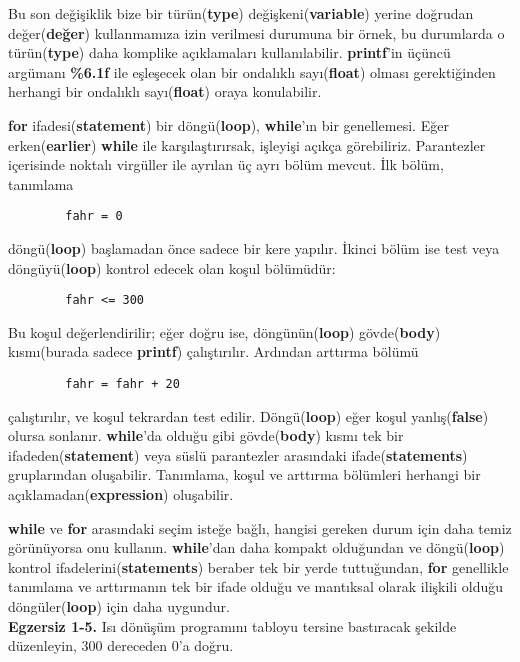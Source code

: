 \documentclass[a4paper,12pt,oneside]{book}
\begin{document}
\par Bu son değişiklik bize bir türün(\textbf{type}) değişkeni(\textbf{variable}) yerine doğrudan değer(\textbf{değer}) kullanmamıza izin verilmesi durumuna bir örnek, bu durumlarda o türün(\textbf{type}) daha komplike açıklamaları kullanılabilir. \textbf{printf}'in üçüncü argümanı \textbf{\%6.1f} ile eşleşecek olan bir ondalıklı sayı(\textbf{float}) olması gerektiğinden herhangi bir ondalıklı sayı(\textbf{float}) oraya konulabilir.
\par \textbf{for} ifadesi(\textbf{statement}) bir döngü(\textbf{loop}), \textbf{while}'ın bir genellemesi. Eğer erken(\textbf{earlier}) \textbf{while} ile karşılaştırırsak, işleyişi açıkça görebiliriz. Parantezler içerisinde noktalı virgüller ile ayrılan üç ayrı bölüm mevcut. İlk bölüm, tanımlama
\begin{lstlisting}
		fahr = 0
\end{lstlisting}
döngü(\textbf{loop}) başlamadan önce sadece bir kere yapılır. İkinci bölüm ise test veya döngüyü(\textbf{loop}) kontrol edecek olan koşul bölümüdür:
\begin{lstlisting}
		fahr <= 300
\end{lstlisting}
Bu koşul değerlendirilir; eğer doğru ise, döngünün(\textbf{loop}) gövde(\textbf{body}) kısmı(burada sadece \textbf{printf}) çalıştırılır. Ardından arttırma bölümü
\begin{lstlisting}
		fahr = fahr + 20
\end{lstlisting}
çalıştırılır, ve koşul tekrardan test edilir. Döngü(\textbf{loop}) eğer koşul yanlış(\textbf{false}) olursa sonlanır. \textbf{while}'da olduğu gibi gövde(\textbf{body}) kısmı tek bir ifadeden(\textbf{statement}) veya süslü parantezler arasındaki ifade(\textbf{statements}) gruplarından oluşabilir. Tanımlama, koşul ve arttırma bölümleri herhangi bir açıklamadan(\textbf{expression}) oluşabilir.
\par \textbf{while} ve \textbf{for} arasındaki seçim isteğe bağlı, hangisi gereken durum için daha temiz görünüyorsa onu kullanın. \textbf{while}'dan daha kompakt olduğundan ve döngü(\textbf{loop}) kontrol ifadelerini(\textbf{statements}) beraber tek bir yerde tuttuğundan, \textbf{for} genellikle tanımlama ve arttırmanın tek bir ifade olduğu ve mantıksal olarak ilişkili olduğu döngüler(\textbf{loop}) için daha uygundur. \newline
\\ \textbf{Egzersiz 1-5.} Isı dönüşüm programını tabloyu tersine bastıracak şekilde düzenleyin, 300 dereceden 0'a doğru. \pagebreak
\end{document}
